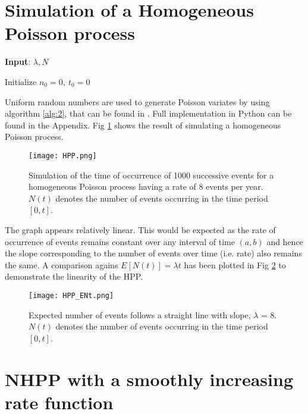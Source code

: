 \documentclass[%
 reprint,
 amsmath,amssymb,
 aps,
]{revtex4-2}
\theoremstyle{definition}
\begin{document}
\section{\label{q:3}Simulation of a Homogeneous Poisson process}

\begin{algorithm}
\label{alg:2}
\caption{Simulation of a Homogeneous Poisson Process with Rate $\lambda$, on $[0, T]$. Slight variation of Algorithm 1 in Chen, 2016 \cite{chen}}
\textbf{Input}: $\lambda,N$

Initialize $n_0 = 0 ,\  t_0 = 0$\;
\end{algorithm}

Uniform random numbers are used to generate Poisson variates by using algorithm \ref{alg:2}, that can be found in \cite{chen}. Full implementation in Python can be found in the Appendix. Fig \ref{fig:hpp} shows the result of simulating a homogeneous Poisson process.

\begin{figure}[H]
\centering
\texttt{[image: HPP.png]}
\caption{\label{fig:hpp}Simulation of the time of occurrence of 1000 successive events for a homogeneous Poisson process having a rate of 8 events per year. $N(t)$ denotes the number of events occurring in the time period $[0,t]$.}
\end{figure}

The graph appears relatively linear. This would be expected as the rate of occurrence of events remains constant over any interval of time $(a,b)$ and hence the slope corresponding to the number of events over time (i.e. rate) also remains the same. A comparison agains $E[N(t)] = \lambda t$ has been plotted in Fig \ref{fig:hppent} to demonstrate the linearity of the HPP.

\begin{figure}[H]
\centering
\texttt{[image: HPP\_ENt.png]}
\caption{\label{fig:hppent}Expected number of events follows a straight line with slope, $\lambda$ = 8. $N(t)$ denotes the number of events occurring in the time period $[0,t]$.}
\end{figure}

\section{\label{q:4}NHPP with a smoothly increasing rate function}
\end{document}
